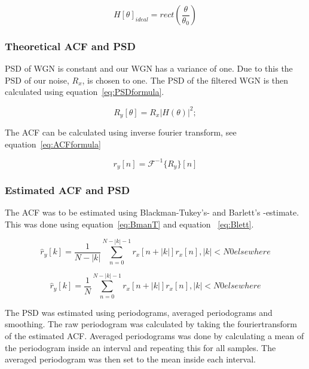 \documentclass[10pt]{article}
\begin{document}
\begin{equation}
  \label{eq:idealH}
  H[\theta]_{ideal} =rect(\frac{\theta}{\theta_0} )
\end{equation}

\subsubsection{Theoretical ACF and PSD}
PSD of WGN is constant and our WGN has a variance of one. Due to this the PSD
of our noise, $R_x$, is chosen to one.
The PSD of the filtered WGN is then calculated using equation~\ref{eq:PSDformula}.

\begin{equation}
  \label{eq:PSDformula}
  R_y[\theta] = R_x|H(\theta)|^2;
\end{equation}

The ACF can be calculated using inverse fourier transform, see equation~\ref{eq:ACFformula}

\begin{equation}
  \label{eq:ACFformula}
  r_y[n] = \mathcal{F}^{-1}\{R_y\}[n]
\end{equation}

\subsubsection{Estimated ACF and PSD}
The ACF was to be estimated using Blackman-Tukey's- and Barlett's -estimate.
This was done using equation~\ref{eq:BmanT} and equation ~\ref{eq:Blett}.

\begin{equation}
\label{eq:BmanT}
\hat{r}_y[k] = \frac{1}{N-|k|}\sum_{n=0}^{N-|k|-1}r_x[n+|k|]r_x[n], |k|<N
		0 elsewhere
\end{equation}

\begin{equation}
\label{eq:Blett}
\hat{r}_y[k] = \frac{1}{N}\sum_{n=0}^{N-|k|-1}r_x[n+|k|]r_x[n], |k|<N
		0 elsewhere
\end{equation}

The PSD was estimated using periodograms, averaged periodograms
and smoothing. The raw periodogram was calculated by taking the fouriertransform
of the estimated ACF.
Averaged periodograms was done by calculating a mean of the periodogram inside
an interval and repeating this for all samples. The averaged periodogram was
then set to the mean inside each interval.

\end{document}
